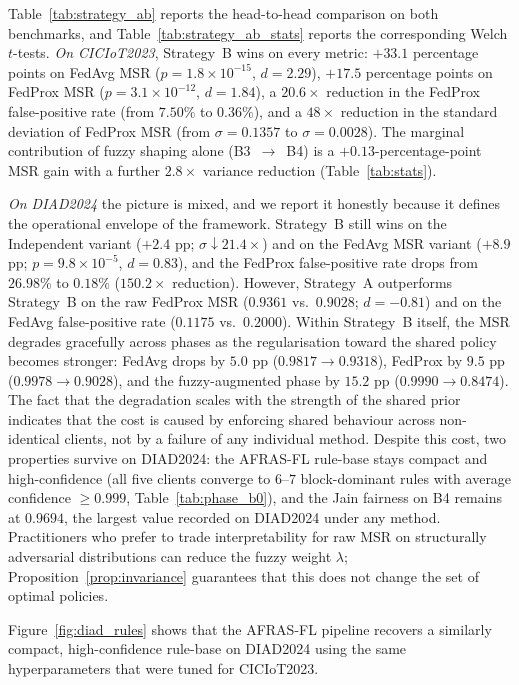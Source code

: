 \documentclass[ai,article,submit,moreauthors,pdftex]{Definitions/mdpi}
\begin{document}
Table~\ref{tab:strategy_ab} reports the head-to-head comparison on both
benchmarks, and Table~\ref{tab:strategy_ab_stats} reports the
corresponding Welch $t$-tests. \emph{On CICIoT2023}, Strategy~B wins on
every metric: $+33.1$ percentage points on FedAvg MSR
($p = 1.8 \times 10^{-15}$, $d = 2.29$), $+17.5$ percentage points on
FedProx MSR ($p = 3.1 \times 10^{-12}$, $d = 1.84$), a $20.6\times$
reduction in the FedProx false-positive rate (from $7.50\%$ to
$0.36\%$), and a $48\times$ reduction in the standard deviation of
FedProx MSR (from $\sigma = 0.1357$ to $\sigma = 0.0028$). The
marginal contribution of fuzzy shaping alone (B3~$\to$~B4) is a
$+0.13$-percentage-point MSR gain with a further $2.8\times$ variance
reduction (Table~\ref{tab:stats}).

\emph{On DIAD2024} the picture is mixed, and we report it honestly
because it defines the operational envelope of the framework.
Strategy~B still wins on the Independent variant ($+2.4$ pp;
$\sigma\!\downarrow\!21.4\times$) and on the FedAvg MSR variant
($+8.9$ pp; $p = 9.8\times 10^{-5}$, $d = 0.83$), and the FedProx
false-positive rate drops from $26.98\%$ to $0.18\%$ ($150.2\times$
reduction). However, Strategy~A outperforms Strategy~B on the raw
FedProx MSR ($0.9361$ vs.\ $0.9028$; $d = -0.81$) and on the FedAvg
false-positive rate ($0.1175$ vs.\ $0.2000$). Within Strategy~B
itself, the MSR degrades gracefully across phases as the regularisation
toward the shared policy becomes stronger: FedAvg drops by $5.0$ pp
($0.9817 \to 0.9318$), FedProx by $9.5$ pp
($0.9978 \to 0.9028$), and the fuzzy-augmented phase by $15.2$ pp
($0.9990 \to 0.8474$). The fact that the degradation scales with the
strength of the shared prior indicates that the cost is caused by
enforcing shared behaviour across non-identical clients, not by a
failure of any individual method. Despite this cost, two properties
survive on DIAD2024: the AFRAS-FL rule-base stays compact and
high-confidence (all five clients converge to $6$--$7$ block-dominant
rules with average confidence $\ge 0.999$, Table~\ref{tab:phase_b0}),
and the Jain fairness on B4 remains at $0.9694$, the largest value
recorded on DIAD2024 under any method. Practitioners who prefer to
trade interpretability for raw MSR on structurally adversarial
distributions can reduce the fuzzy weight $\lambda$;
Proposition~\ref{prop:invariance} guarantees that this does not change
the set of optimal policies.

Figure~\ref{fig:diad_rules} shows that the AFRAS-FL pipeline recovers a
similarly compact, high-confidence rule-base on DIAD2024 using the same
hyperparameters that were tuned for CICIoT2023.
\end{document}
